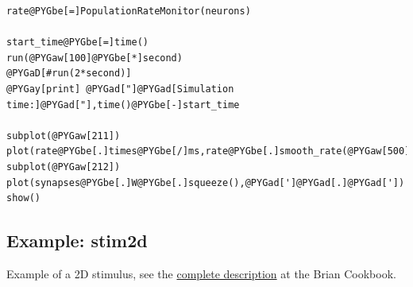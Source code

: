 \documentclass[letterpaper,10pt]{manual}
\begin{document}
\begin{Verbatim}[commandchars=@\[\]]
rate@PYGbe[=]PopulationRateMonitor(neurons)

start_time@PYGbe[=]time()
run(@PYGaw[100]@PYGbe[*]second)
@PYGaD[#run(2*second)]
@PYGay[print] @PYGad["]@PYGad[Simulation time:]@PYGad["],time()@PYGbe[-]start_time

subplot(@PYGaw[211])
plot(rate@PYGbe[.]times@PYGbe[/]ms,rate@PYGbe[.]smooth_rate(@PYGaw[500]@PYGbe[*]ms))
subplot(@PYGaw[212])
plot(synapses@PYGbe[.]W@PYGbe[.]squeeze(),@PYGad[']@PYGad[.]@PYGad['])
show()
\end{Verbatim}

\resetcurrentobjects
{}

\hypertarget{index-54}{}\subsection{Example: stim2d}

Example of a 2D stimulus, see the
\href{http://neuralensemble.org/cookbook/wiki/Brian/StimulusArrayGroup}{complete description}
at the Brian Cookbook.
\end{document}
